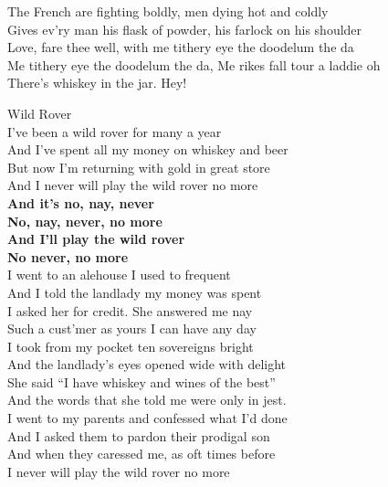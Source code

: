 \documentclass[letterpaper,9pt]{article}
\begin{document}
The French are fighting boldly, men dying hot and coldly \\
Gives ev'ry man his flask of powder, his farlock on his shoulder \\
Love, fare thee well, with me tithery eye the doodelum the da \\
Me tithery eye the doodelum the da, Me rikes fall tour a laddie oh \\
There's whiskey in the jar. Hey! \\

\newpage
{}
\Huge
Wild Rover\\

\LARGE
I’ve been a wild rover for many a year \\
And I’ve spent all my money on whiskey and beer \\
But now I’m returning with gold in great store \\
And I never will play the wild rover no more \\

\textbf{And it’s no, nay, never \\
No, nay, never, no more \\
And I’ll play the wild rover \\
No never, no more} \\

I went to an alehouse I used to frequent \\
And I told the landlady my money was spent \\
I asked her for credit. She answered me nay \\
Such a cust’mer as yours I can have any day \\

I took from my pocket ten sovereigns bright \\
And the landlady’s eyes opened wide with delight \\
She said “I have whiskey and wines of the best” \\
And the words that she told me were only in jest. \\

I went to my parents and confessed what I’d done \\
And I asked them to pardon their prodigal son \\
And when they caressed me, as oft times before \\
I never will play the wild rover no more \\
\end{document}
